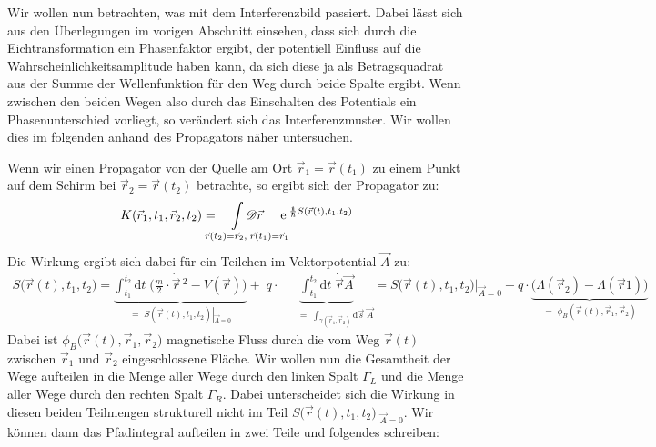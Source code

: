 Wir wollen nun betrachten, was mit dem Interferenzbild passiert. Dabei lässt sich aus den Überlegungen im vorigen Abschnitt einsehen, dass sich durch die Eichtransformation ein Phasenfaktor ergibt, der potentiell Einfluss auf die Wahrscheinlichkeitsamplitude haben kann, da sich diese ja als Betragsquadrat aus der Summe der Wellenfunktion für den Weg durch beide Spalte ergibt. Wenn zwischen den beiden Wegen also durch das Einschalten des Potentials ein Phasenunterschied vorliegt, so verändert sich das Interferenzmuster. Wir wollen dies im folgenden anhand des Propagators näher untersuchen. 

Wenn wir einen Propagator von der Quelle am Ort $\vec{r}_1=\vec{r}(t_1)$ zu einem Punkt auf dem Schirm bei $\vec{r}_2=\vec{r}(t_2)$ betrachte, so ergibt sich der Propagator zu:
\begin{eqnarray*}
	K(\vec{r}_1,t_1,\vec{r}_2,t_2) &=& \!\!\!\!\!\!\!\!\!\!\!\underset{\vec{r}(t_2)=\vec{r}_2,\;\vec{r}(t_1)=\vec{r}_1}{\int\mathscr{D}\vec{r}} \!\!\!\! \e^{\;\frac{\I}{\hbar} S(\vec{r}(t),t_1,t_2)} 
\end{eqnarray*}
Die Wirkung ergibt sich dabei für ein Teilchen im Vektorpotential $\vec{A}$ zu: 
\begin{eqnarray*}
	S\big(\vec{r}(t),t_1,t_2\big) = \underbrace{\int_{t_1}^{t_2}\!\!\!\!\mathrm{d}t\; \Big(\frac{m}{2}\cdot \dot{\vec{r}}\,^2 - V(\vec{r})\Big)}_{=\;S(\vec{r}(t),t_1,t_2)\left|_{\vec{A}=0}\right.} + \;q\cdot\!\!\!\!\!\!\!\!\!\!\!\!\!\underbrace{\int_{t_1}^{t_2}\!\!\!\!\mathrm{d}t\;\dot{\vec{r}}\vec{A}}_{\qquad =\;\int_{\gamma(\vec{r}_1,\vec{r}_2)}\mathrm{d}\vec{s}\;\vec{A}}\!\!\!\!\!\!\!\!\! = S\big(\vec{r}(t),t_1,t_2\big)\big|_{\vec{A}=0}+q\cdot\!\!\underbrace{\big(\Lambda(\vec{r}_2)-\Lambda(\vec{r}1)\big)}_{=\;\phi_B(\vec{r}(t),\vec{r}_1,\vec{r}_2)}
\end{eqnarray*}
Dabei ist $\phi_B\big(\vec{r}(t),\vec{r}_1,\vec{r}_2\big)$ magnetische Fluss durch die vom Weg $\vec{r}(t)$ zwischen $\vec{r}_1$ und $\vec{r}_2$ eingeschlossene Fläche. Wir wollen nun die Gesamtheit der Wege aufteilen in die Menge aller Wege durch den linken Spalt $\Gamma_{\!\!L}$ und die Menge aller Wege durch den rechten Spalt $\Gamma_{\!\!R}$. Dabei unterscheidet sich die Wirkung in diesen beiden Teilmengen strukturell nicht im Teil $S\big(\vec{r}(t),t_1,t_2\big)\big|_{\vec{A}=0}$. Wir können dann das Pfadintegral aufteilen in zwei Teile und folgendes schreiben: 
